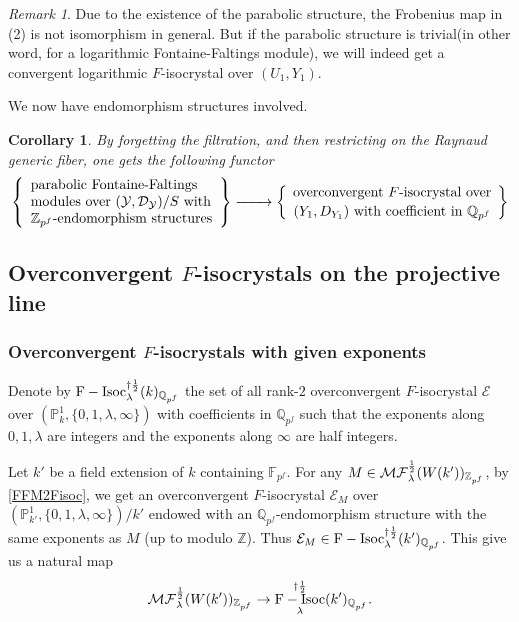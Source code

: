 \documentclass[12pt,twoside]{book}
\theoremstyle{plain}
\newtheorem{corollary}[corollary]{Corollary}
\theoremstyle{definition}
\theoremstyle{remark}
\newtheorem{remark}[remark]{Remark}
\newcommand{\bF}{{\mathbb F}}
\newcommand{\bP}{{\mathbb P}}
\newcommand{\bQ}{{\mathbb Q}}
\newcommand{\bZ}{{\mathbb Z}}
\newcommand{\mD}{{\mathcal D}}
\newcommand{\mE}{{\mathcal E}}
\newcommand{\mY}{{\mathcal Y}}
\newcommand{\MF}{\mathcal{MF}}
\DeclareMathOperator{\FIsoc}{F-Isoc}
\numberwithin{equation}{section}
\def\FIsoch{{\FIsoc^{\dagger{1\over 2}}_{\lambda} }}
\def\MFh{\MF^{{1\over 2}}_{\lambda}}
\begin{document}
\begin{remark}
Due to the existence of the parabolic structure, the Frobenius map in (2) is not isomorphism in general. But if the parabolic structure is trivial(in other word, for a logarithmic Fontaine-Faltings module), we will indeed get a convergent logarithmic $F$-isocrystal over $(U_1,Y_1)$.
\end{remark}

We now have endomorphism structures involved.
\begin{corollary} \label{FFM2Fisoc} By forgetting the filtration, and then restricting on the Raynaud generic fiber, one gets the following functor
\begin{equation*}
\left\{
\begin{array}{lll}
\text{parabolic Fontaine-Faltings}\\
\text{modules over $(\mY,\mD_{\mY})/S$ with}\\
\text{$\bZ_{p^f}$-endomorphism structures}\\
\end{array}
\right\}
\xrightarrow{\quad\quad}
\left\{{\text{
overconvergent $F$-isocrystal over
} \atop \text{
$(Y_1,D_{Y_1})$ with coefficient in $\bQ_{p^f}$
}}\right\}
\end{equation*}
\end{corollary}


\subsection{Overconvergent $F$-isocrystals on the projective line}

\subsubsection{Overconvergent $F$-isocrystals with given exponents}

Denote by \emph{$\FIsoch(k)_{\bQ_{p^f}}$} the set of all rank-$2$ overconvergent $F$-isocrystal $\mE$ over $(\bP^1_{k},\{0,1,\lambda,\infty\})$ with coefficients in $\bQ_{p^f}$ such that the exponents along $0,1,\lambda$ are integers and the exponents along $\infty$ are half integers.

Let $k'$ be a field extension of $k$ containing $\bF_{p^f}$. For any $M\in \MFh(W(k'))_{\bZ_{p^f}}$, by \autoref{FFM2Fisoc}, we get an overconvergent $F$-isocrystal $\mE_M$ over $(\mathbb P^1_{k'},\{0,1,\lambda,\infty\})/k'$ endowed with an $\bQ_{p^f}$-endomorphism structure with the same exponents as $M$ (up to modulo $\bZ$). Thus $\mE_M\in \FIsoch(k')_{\bQ_{p^f}}$. This give us a
natural map
\begin{equation} \label{eq_MF2Fisoc}
\MFh(W(k'))_{\bZ_{p^f}} \rightarrow \FIsoch(k')_{\bQ_{p^f}}.
\end{equation}
\end{document}
